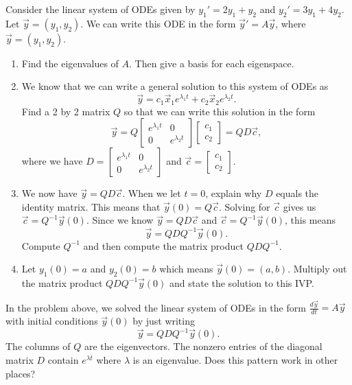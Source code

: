 \begin{problem}
 Consider the linear system of ODEs given by $y_1'=2y_1+y_2$ and $y_2'=3y_1+4y_2$. Let $\vec y = (y_1,y_2)$. We can write this ODE in the form $\vec y' = A\vec y$, where $\vec y = (y_1,y_2)$.  
 \begin{enumerate}
  \item Find the eigenvalues of $A$.  Then give a basis for each eigenspace.
  \item We know that we can write a general solution to this system of ODEs as 
$$
\vec y=
c_1\vec x_1 e^{\lambda_1 t }+c_2\vec x_2 e^{\lambda_2 t}.
$$
Find a 2 by 2 matrix $Q$ so that we can write this solution in the form 
$$
\vec y=
Q\begin{bmatrix}
 e^{\lambda_1 t} & 0\\
 0 & e^{\lambda_2 t}
\end{bmatrix}
\begin{bmatrix}
c_1\\c_2 
\end{bmatrix}
=QD\vec c,
$$
where we have $D=
\begin{bmatrix}
 e^{\lambda_1 t} & 0\\
 0 & e^{\lambda_2 t}
\end{bmatrix}$ 
and  
$\vec c =
\begin{bmatrix}
c_1\\c_2 
\end{bmatrix}
$.
\item We now have $\vec y = QD\vec c$. When we let $t=0$, explain why $D$ equals the identity matrix. This means that $\vec y(0) = Q\vec c$.  Solving for $\vec c$ gives us $\vec c= Q^{-1}\vec y(0)$.%
%
Since we know $\vec y = QD\vec c$ and $\vec c= Q^{-1}\vec y(0)$, this means 
$$\vec y = QDQ^{-1}\vec y(0).$$
Compute $Q^{-1}$ and then compute the matrix product $QDQ^{-1}$.  
\item Let $y_1(0)=a$ and $y_2(0)=b$ which means $\vec y(0)=(a,b)$. Multiply out the matrix product $QDQ^{-1}\vec y(0)$ and state the solution to this IVP.
\end{enumerate}

\end{problem}

In the problem above, we solved the linear system of ODEs in the form $\frac{d\vec y}{dt} = A\vec y$  with initial conditions $\vec y(0)$ by just writing
$$\vec y = QDQ^{-1}\vec y(0).$$
The columns of $Q$ are the eigenvectors. The nonzero entries of the diagonal matrix $D$ contain $e^{\lambda t}$ where $\lambda$ is an eigenvalue.  Does this pattern work in other places?

